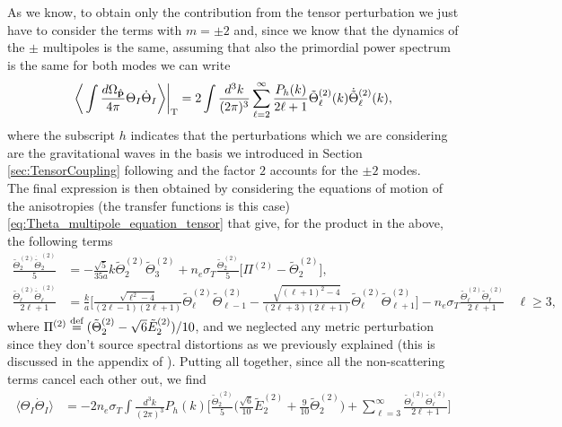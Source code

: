 As we know, to obtain only the contribution from the tensor perturbation we just have to consider the terms with $m=\pm2$ and, since we know that the dynamics of the $\pm$ multipoles is the same, assuming that also the primordial power spectrum is the same for both modes we can write $$\bigg\langle\int\frac{d\Omega_{\mathbf{\hat{p}}}}{4\pi}\Theta_I\dot \Theta_I\bigg\rangle\bigg|_\text{T}=2\int\frac{d^3k}{(2\pi)^3}\sum_{\ell=2}^{\infty}\frac{{P}_h (k)}{2\ell+1}\tilde\Theta_\ell^{(2)}(k)\dot{\tilde\Theta}_{\ell}^{(2)}(k),$$
where the subscript $h$ indicates that the perturbations which we are considering are the gravitational waves in the basis we introduced in Section \ref{sec:TensorCoupling} following \cite{HuWhite} and the factor $2$ accounts for the $\pm2$  modes.\\ The final expression is then obtained by considering the equations of motion of the anisotropies (the transfer functions is this case) \eqref{eq:Theta_multipole_equation_tensor} that give, for the product in the above, the following terms
\begin{align*}
    \frac{\tilde\Theta_2^{(2)}\dot{\tilde\Theta}_2^{(2)}}{5}&=-\frac{\sqrt{5}}{35a}k\tilde\Theta_2^{(2)}\tilde\Theta_3^{(2)}+n_e\sigma_T\frac{\tilde\Theta_2^{(2)}}{5}\bigg[\Pi^{(2)}-\tilde\Theta_{2}^{(2)}\bigg],\\
    \frac{\tilde\Theta_\ell^{(2)}\dot{\tilde\Theta}_\ell^{(2)}}{2\ell+1}&=\frac{k}{a}\bigg[\frac{\sqrt{\ell^2-4}}{(2\ell-1)(2\ell+1)}\tilde\Theta_\ell^{(2)}\tilde\Theta_{\ell-1}^{(2)}-\frac{\sqrt{(\ell+1)^2-4}}{(2\ell+3)(2\ell+1)}\tilde\Theta_\ell^{(2)}\tilde\Theta_{\ell+1}^{(2)}\bigg]-n_e\sigma_T\frac{\tilde\Theta_\ell^{(2)}\tilde\Theta_{\ell}^{(2)}}{2\ell+1}\quad \ell\geq3,
\end{align*}
where $\Pi^{(2)}\stackrel{\text{def}}{=}(\tilde\Theta_2^{(2)}-\sqrt{6}\tilde E_2^{(2)})/10$, and we neglected any metric perturbation since they don't source spectral distortions as we previously explained (this is discussed in the appendix of \cite{Chluba_tens_diss}). Putting all together, since all the non-scattering terms cancel each other out, we find
\begin{align}
    \langle\Theta_I\dot \Theta_I\rangle&=-2n_e\sigma_T\int\frac{d^3k}{(2\pi)^3}{P}_h (k)\bigg[\frac{\tilde\Theta_2^{(2)}}{5}\bigg(\frac{\sqrt{6}}{10}\tilde E_2^{(2)}+\frac{9}{10}\tilde\Theta_{2}^{(2)}\bigg)+\sum_{\ell=3}^{\infty}\frac{\tilde\Theta_\ell^{(2)}\tilde\Theta_\ell^{(2)}}{2\ell+1}\bigg]
    \label{eq:TT_I_average_tensor}
\end{align}
 
